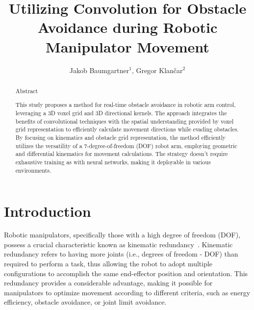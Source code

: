 \documentclass[a4paper]{article}
\begin{document}
\title{Utilizing Convolution for Obstacle Avoidance during Robotic Manipulator Movement}

\author{Jakob Baumgartner$^{1}$, Gregor Klančar$^{2}$} %



\maketitle


\begin{abstract}{Abstract}

This study proposes a method for real-time obstacle avoidance in robotic arm control, leveraging a 3D voxel grid and 3D directional kernels. The approach integrates the benefits of convolutional techniques with the spatial understanding provided by voxel grid representation to efficiently calculate movement directions while evading obstacles. By focusing on kinematics and obstacle grid representation, the method efficiently utilizes the versatility of a 7-degree-of-freedom (DOF) robot arm, employing geometric and differential kinematics for movement calculations. The strategy doesn't require exhaustive training as with neural networks, making it deployable in various environments.

\end{abstract}



\section{Introduction }

Robotic manipulators, specifically those with a high degree of freedom (DOF), possess a crucial characteristic known as kinematic redundancy~\cite{Nguyen1991}. Kinematic redundancy refers to having more joints (i.e., degrees of freedom - DOF) than required to perform a task, thus allowing the robot to adopt multiple configurations to accomplish the same end-effector position and orientation. This redundancy provides a considerable advantage, making it possible for manipulators to optimize movement according to different criteria, such as energy efficiency, obstacle avoidance, or joint limit avoidance.
\end{document}
